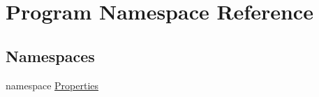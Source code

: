 \hypertarget{namespace_program}{}\section{Program Namespace Reference}
\label{namespace_program}
\subsection*{Namespaces}
\begin{DoxyCompactItemize}
\item 
namespace \hyperlink{namespace_program_1_1_properties}{Properties}
\end{DoxyCompactItemize}
